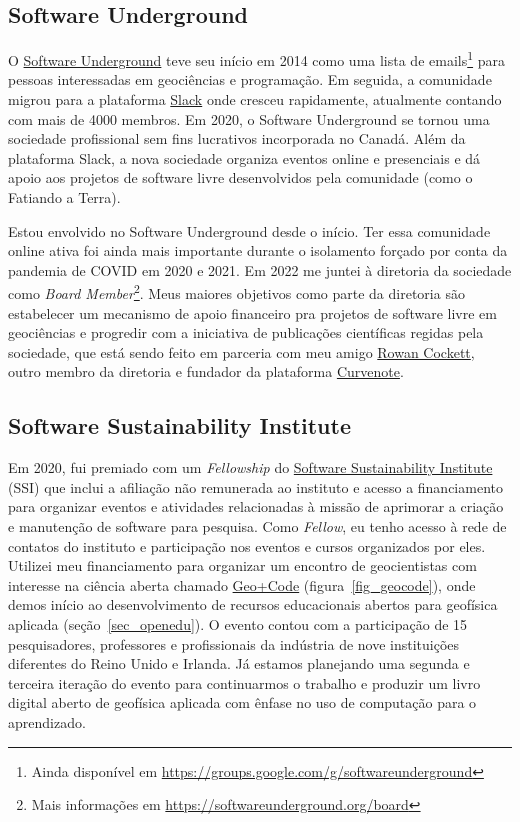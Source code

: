 \documentclass[10pt,a4paper,oneside]{book}
\begin{document}
\subsection{Software Underground}
\label{sec_swung}

O \href{https://softwareunderground.org/}{Software Underground} teve seu início
em 2014 como uma lista de
emails\footnote{Ainda disponível em \url{https://groups.google.com/g/softwareunderground}}
para pessoas interessadas em geociências e programação.
Em seguida, a comunidade migrou para a plataforma
\href{https://softwareunderground.org/slack}{Slack} onde cresceu rapidamente,
atualmente contando com mais de 4000 membros.
Em 2020, o Software Underground se tornou uma sociedade profissional sem fins
lucrativos incorporada no Canadá.
Além da plataforma Slack, a nova sociedade organiza eventos online e
presenciais e dá apoio aos projetos de software livre desenvolvidos pela
comunidade (como o Fatiando a Terra).

Estou envolvido no Software Underground desde o início.
Ter essa comunidade online ativa foi ainda mais importante durante o isolamento
forçado por conta da pandemia de COVID em 2020 e 2021.
Em 2022 me juntei à diretoria da sociedade como
\textit{Board Member}\footnote{Mais informações em \url{https://softwareunderground.org/board}}.
Meus maiores objetivos como parte da diretoria são estabelecer um mecanismo de
apoio financeiro pra projetos de software livre em geociências e progredir com
a iniciativa de publicações científicas regidas pela sociedade, que está sendo
feito em parceria com meu amigo \href{https://row1.ca/}{Rowan Cockett}, outro
membro da diretoria e fundador da plataforma \href{https://curvenote.com/}{Curvenote}.

\subsection{Software Sustainability Institute}

Em 2020, fui premiado com um \textit{Fellowship} do
\href{https://software.ac.uk/}{Software Sustainability Institute} (SSI) que
inclui a afiliação não remunerada ao instituto e acesso a financiamento para
organizar eventos e atividades relacionadas à missão de aprimorar a criação e
manutenção de software para pesquisa.
Como \textit{Fellow}, eu tenho acesso à rede de contatos do instituto e
participação nos eventos e cursos organizados por eles.
Utilizei meu financiamento para organizar um encontro de geocientistas com
interesse na ciência aberta chamado
\href{https://hackmd.io/@leouieda/uk-geo-code-meetup}{Geo+Code}
(figura~\ref{fig_geocode}),
onde demos início ao desenvolvimento de recursos educacionais abertos para
geofísica aplicada (seção~\ref{sec_openedu}).
O evento contou com a participação de 15 pesquisadores, professores e
profissionais da indústria de nove instituições diferentes do Reino Unido e
Irlanda.
Já estamos planejando uma segunda e terceira iteração do evento para
continuarmos o trabalho e produzir um livro digital aberto de geofísica
aplicada com ênfase no uso de computação para o aprendizado.
\end{document}

